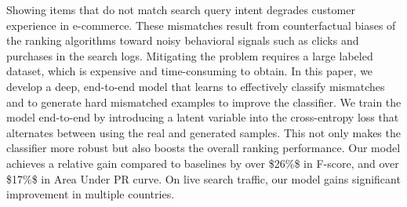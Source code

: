 Showing items that do not match search query intent degrades customer experience in e-commerce. These mismatches result from counterfactual biases of the ranking algorithms toward noisy behavioral signals such as clicks and purchases in the search logs. Mitigating the problem requires a large labeled dataset, which is expensive and time-consuming to obtain.  In this paper, we develop a deep, end-to-end model that learns to effectively classify mismatches and to generate hard mismatched examples to improve the classifier. We train the model end-to-end by introducing a latent variable into the cross-entropy loss that alternates between using the real and generated samples. This not only makes the classifier more robust but also  boosts the overall ranking performance. Our model achieves a relative gain compared to baselines by over \$26\%\$ in F-score, and over \$17\%\$ in Area Under PR curve. On live search traffic, our model gains significant improvement in multiple countries.
